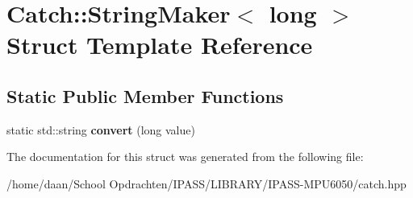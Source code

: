 \hypertarget{structCatch_1_1StringMaker_3_01long_01_4}{}\section{Catch\+:\+:String\+Maker$<$ long $>$ Struct Template Reference}
\label{structCatch_1_1StringMaker_3_01long_01_4}
\subsection*{Static Public Member Functions}
\begin{DoxyCompactItemize}
\item 
\mbox{\label{structCatch_1_1StringMaker_3_01long_01_4_a1c0c56497813e7a6425c5411d5e66447}} 
static std\+::string {\bfseries convert} (long value)
\end{DoxyCompactItemize}


The documentation for this struct was generated from the following file\+:\begin{DoxyCompactItemize}
\item 
/home/daan/\+School Opdrachten/\+I\+P\+A\+S\+S/\+L\+I\+B\+R\+A\+R\+Y/\+I\+P\+A\+S\+S-\/\+M\+P\+U6050/catch.\+hpp\end{DoxyCompactItemize}
